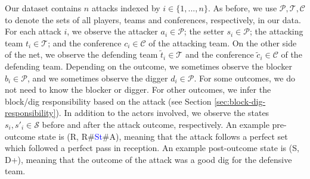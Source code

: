 \documentclass[USenglish]{article}
\theoremstyle{dgthm}
\theoremstyle{dgdef}
\begin{document}
Our dataset contains $n$ attacks indexed by $i \in \{1, ..., n\}$. As before, we use $\mathcal{P}, \mathcal{T}, \mathcal{C}$ to denote the sets of all players, teams and conferences, respectively, in our data. For each attack $i$, we observe the attacker $a_i \in \mathcal{P}$; the setter $s_i \in \mathcal{P}$; the attacking team $t_i \in \mathcal{T}$; and the conference $c_i \in \mathcal{C}$ of the attacking team. On the other side of the net, we observe the defending team $\tilde t_i \in \mathcal{T}$ and the conference $\tilde c_i \in \mathcal C$ of the defending team. Depending on the outcome, we sometimes observe the blocker $b_i \in \mathcal{P}$, and we sometimes observe the digger $d_i \in \mathcal{P}$. For some outcomes, we do not need to know the blocker or digger. For other outcomes, we infer the block/dig responsibility based on the attack (see Section \ref{sec:block-dig-responsibility}). In addition to the actors involved, we observe the states $s_i, s'_i \in \mathcal{S}$ before and after the attack outcome, respectively. An example pre-outcome state is (R, R\#\textcolor{blue}{St}\#A), meaning that the attack follows a perfect set which followed a perfect pass in reception. An example post-outcome state is (S, D+), meaning that the outcome of the attack was a good dig for the defensive team.
\end{document}
